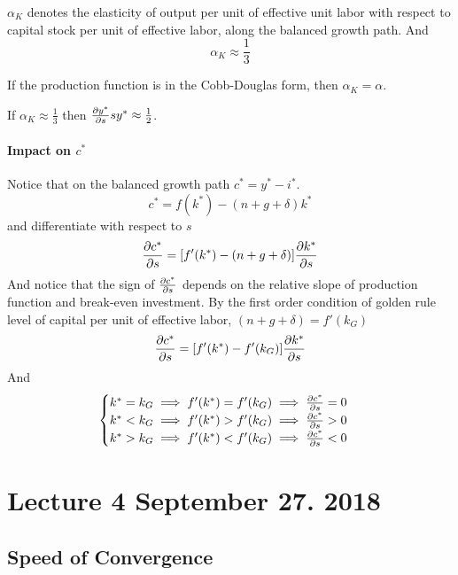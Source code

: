 \documentclass[]{article}
\begin{document}
			\begin{remark}
				$\alpha_K$ denotes the elasticity of output per unit of effective unit labor with respect to capital stock per unit of effective labor, along the balanced growth path. And
				\[
					\alpha_K \approx \frac{1}{3}
				\]
			\end{remark}
			
			\begin{remark}
				If the production function is in the Cobb-Douglas form, then $\alpha_K = \alpha$.
			\end{remark}
			
			\begin{example}
				If $\alpha_K \approx \frac{1}{3}$ then $\frac{\partial{y^*}}{\partial{s}}{s}{y^*} \approx \frac{1}{2}$.
			\end{example}
			
			\paragraph{Impact on $c^*$} Notice that on the balanced growth path $c^* = y^* - i^*$.
			\begin{equation}
				c^* = f(k^*) - (n+g+\delta)k^*
			\end{equation}
			and differentiate with respect to $s$
			\[
				\frac{\partial{c^*}}{\partial{s}} = [f'(k^*) - (n+g+\delta)] \frac{\partial{k^*}}{\partial{s}}
			\]
			And notice that the sign of $\frac{\partial{c^*}}{\partial{s}}$ depends on the relative slope of production function and break-even investment.
			By the first order condition of golden rule level of capital per unit of effective labor, $(n+g+\delta) = f'(k_G)$
			\begin{gather*}
				\frac{\partial{c^*}}{\partial{s}} = [f'(k^*) - f'(k_G)]\frac{\partial{k^*}}{\partial{s}}
			\end{gather*}
			And 
			\begin{equation*}
				\begin{cases}
					k^* = k_G \implies f'(k^*) = f'(k_G) \implies \frac{\partial{c^*}}{\partial{s}} = 0 \\
					k^* < k_G \implies f'(k^*) > f'(k_G) \implies \frac{\partial{c^*}}{\partial{s}} > 0 \\
					k^* > k_G \implies f'(k^*) < f'(k_G) \implies \frac{\partial{c^*}}{\partial{s}} < 0
				\end{cases}
			\end{equation*}
	\section{Lecture 4 September 27. 2018}
	\subsection{Speed of Convergence}
\end{document}
